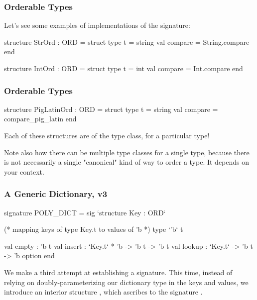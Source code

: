 \documentclass[aspectratio=169, handout]{beamer}
\begin{document}
\begin{frame}[fragile]
  \frametitle{Orderable Types}

  Let's see some examples of implementations of the  signature:

  \pause
  \begin{codeblock}
    structure StrOrd : ORD =
      struct
        type t = string
        val compare = String.compare
      end

    structure IntOrd : ORD =
      struct
        type t = int
        val compare = Int.compare
      end
  \end{codeblock}
\end{frame}

\begin{frame}[fragile]
  \frametitle{Orderable Types}

  \begin{codeblock}
    structure PigLatinOrd : ORD =
      struct
        type t = string
        val compare = compare_pig_latin
      end
  \end{codeblock}

  \pause
  \vspace{\fill}

  Each of these structures are  of the  type class,
  for a particular type!

  \pause
  \vspace{\fill}


  \pause
  \vspace{\fill}

  Note also how there can be multiple type classes for a single type, because there
  is not necessarily a single "canonical" kind of way to order a type. It depends
  on your context.
\end{frame}

\begin{frame}[fragile]
  \frametitle{A Generic Dictionary, v3}

  {\small
  \begin{codeblock}
    signature POLY_DICT =
      sig
        `structure Key : ORD`

        (* mapping keys of type Key.t to values of 'b *)
        type `'b` t

        val empty : 'b t
        val insert : `Key.t` * 'b -> 'b t -> 'b t
        val lookup : `Key.t` -> 'b t -> 'b option
      end
  \end{codeblock}
  }

  \pause
  \vspace{\fill}

  We make a third attempt at establishing a  signature.
  This time, instead of relying on doubly-parameterizing our dictionary
  type in the keys and values, we introduce an interior structure
  , which ascribes to the signature .
\end{frame}
\end{document}
